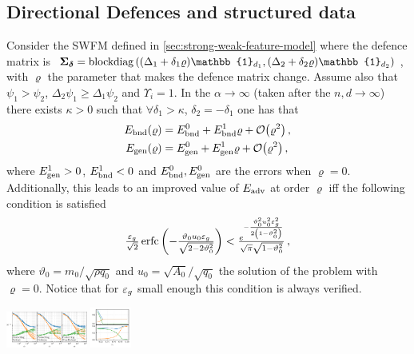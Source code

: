 \documentclass[a0paper,fleqn]{betterportraitposter}
\theoremstyle{plain}
\theoremstyle{definition}
\theoremstyle{remark}
\begin{document}
{\begin{multicols}{3}
\subsection{Directional Defences and structured data}

Consider the SWFM defined in \cref{sec:strong-weak-feature-model}
where the defence matrix is 
\(
    \Sigmadelta = \operatorname{blockdiag}\qty( 
        (\Delta_1 + \delta_1 \varrho ) \mathbb{1}_{d_1}, (\Delta_2 + \delta_2 \varrho ) \mathbb{1}_{d_2} 
    )
\), 
with \(\varrho\) the parameter that makes the defence matrix change.
Assume also that \(\psi_1 > \psi_2\), \(\Delta_2 \psi_1 \geq \Delta_1 \psi_2\) and \(\Upsilon_i = 1\).
In the \(\alpha\to \infty\) (taken after the \(n,d\to\infty\)) there exists \(\kappa > 0\) such that \(\forall \delta_1 > \kappa\), \(\delta_2 = -\delta_1\) one has that
\begin{equation}
\begin{aligned}
    \bounderr(\varrho) &= \bounderr^0 + \bounderr^1 \varrho + \order{\varrho^2} \,, \\
    \generr(\varrho) &= \generr^0 + \generr^1 \varrho + \order{\varrho^2} \,,
\end{aligned}
\end{equation}
where \(E_{\mathrm{gen}}^1 > 0\), \(E_{\mathrm{bnd}}^1 < 0\) and \(E_{\mathrm{bnd}}^0,E_{\mathrm{gen}}^0\) are the errors when \(\varrho =0\).
Additionally, this leads to an improved value of \(E_{\mathrm{adv}}\) at order \(\varrho\) iff the following condition is satisfied
\vspace{-5pt}
\begin{equation}
    {\textstyle
        \frac{\ensuremath{\varepsilon_g}}{\sqrt{2}}
        \operatorname*{erfc}\qty( -\frac{\vartheta_0 u_0 \ensuremath{\varepsilon_g}}{ \sqrt{2-2 \vartheta_0 ^2} }) 
        < \frac{e^{-\frac{\vartheta_0^2 u_0^2 \ensuremath{\varepsilon_g}^2}{2 \left(1-\vartheta_0 ^2\right) } }}{\sqrt{\pi} \sqrt{1-\vartheta_0^2}} \,,
    }
\end{equation}
where \(\vartheta_0 = m_0 / \sqrt{\rho q_0}\) and \(u_0 = \sqrt{A_0} / \sqrt{q_0}\) the solution of the problem with \(\varrho = 0\). 
Notice that for \(\varepsilon_g\) small enough this condition is always verified.

\begin{center}
    \includegraphics[width=0.2\textwidth]{Assets/defence_sweep.pdf}
    \includegraphics[width=0.1\textwidth]{Assets/optimal_defense.pdf}
\end{center}




\end{multicols}}
\end{document}
